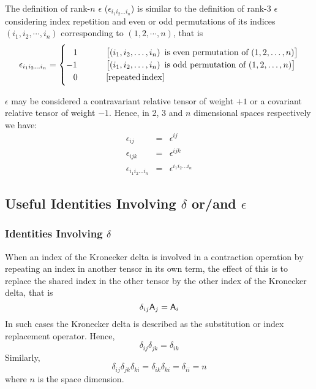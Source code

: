  The definition of rank-$n$ $\epsilon$ ($\epsilon_{i_{1}i_{2}\ldots i_{n}}$)
is similar to the definition of rank-3 $\epsilon$ considering index
repetition and even or odd permutations of its indices $\left(i_{1},i_{2},\cdots,i_{n}\right)$
corresponding to $\left(1,2,\cdots,n\right)$, that is
\begin{equation}
\epsilon_{i_{1}i_{2}\ldots i_{n}}=\begin{cases}
\,\,\,\,\,1 & \left[\left(i_{1},i_{2},\ldots,i_{n}\right)\text{ is even permutation of (\ensuremath{1,2,\ldots,n})}\right]\\
-1 & \left[\left(i_{1},i_{2},\ldots,i_{n}\right)\text{ is odd permutation of (\ensuremath{1,2,\ldots,n})}\right]\\
\,\,\,\,\,0\,\,\,\,\,\,\,\,\,\,\,\,\,\, & \text{\ensuremath{\left[\mathrm{repeated\,index}\right]}}
\end{cases}\label{eqEpsilonnDefinition}
\end{equation}


 $\epsilon$ may be considered a contravariant relative
tensor of weight $+1$ or a covariant relative tensor of weight $-1$.
Hence, in 2, 3 and $n$ dimensional spaces respectively we have:
\begin{eqnarray}
\epsilon_{ij} & = & \epsilon^{ij}\\
\epsilon_{ijk} & = & \epsilon^{ijk}\\
\epsilon_{i_{1}i_{2}\ldots i_{n}} & = & \epsilon^{i_{1}i_{2}\ldots i_{n}}
\end{eqnarray}



\subsection{Useful Identities Involving $\delta$ or/and $\epsilon$}


\subsubsection{Identities Involving $\delta$}

 When an index of the Kronecker delta is involved in a contraction
operation by repeating an index in another tensor in its own term,
the effect of this is to replace the shared index in the other tensor
by the other index of the Kronecker delta, that is
\begin{equation}
\delta_{ij}\mathsf{A}_{j}=\mathsf{A}_{i}\label{EqIndexReplace}
\end{equation}
In such cases the Kronecker delta is described as the substitution
or index replacement operator. Hence,
\begin{equation}
\delta_{ij}\delta_{jk}=\delta_{ik}
\end{equation}
Similarly,
\begin{equation}
\delta_{ij}\delta_{jk}\delta_{ki}=\delta_{ik}\delta_{ki}=\delta_{ii}=n\label{eqdeltas}
\end{equation}
where $n$ is the space dimension.

